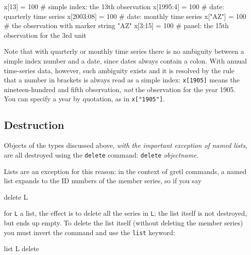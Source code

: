 \begin{code}
x[13]      = 100  # simple index: the 13th observation
x[1995:4]  = 100  # date: quarterly time series
x[2003:08] = 100  # date: monthly time series
x["AZ"]    = 100  # the observation with marker string "AZ"
x[3:15]    = 100  # panel: the 15th observation for the 3rd unit
\end{code}

Note that with quarterly or monthly time series there is no ambiguity
between a simple index number and a date, since dates always contain a
colon. With annual time-series data, however, such ambiguity exists
and it is resolved by the rule that a number in brackets is always
read as a simple index: \texttt{x[1905]} means the nineteen-hundred
and fifth observation, \textit{not} the observation for the year 1905.
You can specify a year by quotation, as in \verb|x["1905"]|.

\subsection{Destruction}

Objects of the types discussed above, \textit{with the important
  exception of named lists}, are all destroyed using the
\texttt{delete} command: \texttt{delete} \textsl{objectname}.

Lists are an exception for this reason: in the context of gretl
commands, a named list expands to the ID numbers of the member series,
so if you say

\begin{code}
delete L
\end{code} 

for \texttt{L} a list, the effect is to delete all the series in
\texttt{L}; the list itself is not destroyed, but ends up empty.  To
delete the list itself (without deleting the member series) you must
invert the command and use the \texttt{list} keyword:

\begin{code}
list L delete
\end{code} 
